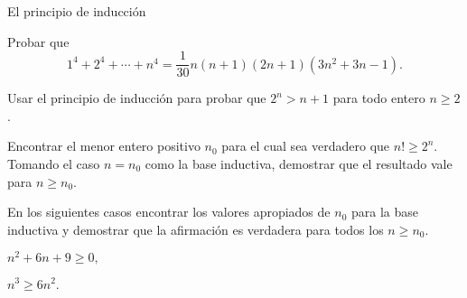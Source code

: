 \begin{section}{El principio de inducción}
\begin{enumex}
\item Probar que
$$
1^4+2^4+\cdots+n^4= \frac{1}{30}n(n+1)(2n+1)(3n^2+3n-1).
$$
\item Usar el principio de inducción para probar que $2^n>n+1$ para todo entero $n\ge2$.

\item Encontrar el menor entero positivo $n_0$ para el cual sea verdadero que $n! \ge 2^n$. Tomando el caso $n=n_0$ como la base inductiva, demostrar que el resultado vale para $n\ge n_0$.

\item En los siguientes casos encontrar los valores apropiados de $n_0$ para la base inductiva y demostrar que la afirmación es verdadera
para todos los $n\ge n_0$.
\begin{enumex}
    \item $n^2 +6n + 9 \ge 0,$
    \item $n^3 \ge 6n^2.$
\end{enumex}
\end{enumex}
\end{section}